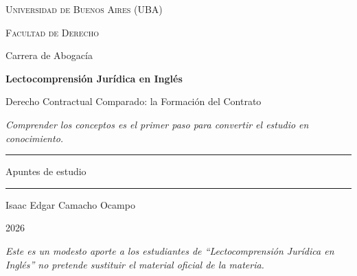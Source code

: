 \documentclass[12pt,oneside]{book}
\newcommand{\universidad}{Universidad de Buenos Aires (UBA)}
\newcommand{\facultad}{Facultad de Derecho}
\newcommand{\carrera}{Carrera de Abogacía}
\newcommand{\materia}{Lectocomprensión Jurídica en Inglés}
\newcommand{\titulo}{Derecho Contractual Comparado: la Formación del Contrato}
\newcommand{\autor}{Isaac Edgar Camacho Ocampo}
\newcommand{\anio}{2026}
\begin{document}
\begin{titlepage}

\thispagestyle{empty}

\begin{center}

\vspace*{1cm}

{\large \textsc{\universidad}}

\vspace{0.2cm}

{\large \textsc{\facultad}}

\vspace{0.2cm}

{\large \carrera}

\vspace{3cm}

{\Huge \textbf{\materia}}

\vspace{1cm}

{\LARGE \titulo}

\vspace{0.8cm}

\textit{Comprender los conceptos es el primer paso para convertir el estudio en conocimiento.}

\vspace{1.2cm}

\rule{0.70\textwidth}{0.5pt}

\vspace{0.5cm}

{\large Apuntes de estudio}

\vspace{0.5cm}

\rule{0.70\textwidth}{0.5pt}

\vfill

{\large \autor}

\vspace{0.3cm}

{\large \anio}

\end{center}

\vfill

\begin{flushleft}
\textit{Este es un modesto aporte a los estudiantes de ``Lectocomprensión Jurídica en Inglés'' no pretende sustituir el material oficial de la materia.}
\end{flushleft}

\end{titlepage}
\end{document}

